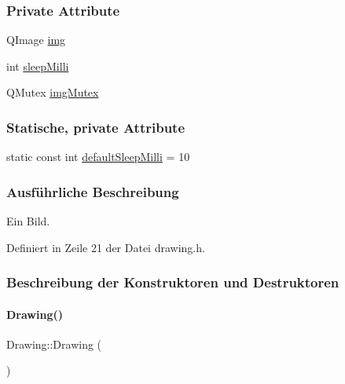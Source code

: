 \subsubsection*{Private Attribute}
\begin{DoxyCompactItemize}
\item 
Q\+Image \mbox{\hyperlink{classDrawing_a8c2defb1fd8bab5ebc0b38da136f8e2b}{img}}
\item 
int \mbox{\hyperlink{classDrawing_a7a904cbe419acdcd9187f1334b0b632c}{sleep\+Milli}}
\item 
Q\+Mutex \mbox{\hyperlink{classDrawing_a1a0a2569cbbab72dffcd088df14428de}{img\+Mutex}}
\end{DoxyCompactItemize}
\subsubsection*{Statische, private Attribute}
\begin{DoxyCompactItemize}
\item 
static const int \mbox{\hyperlink{classDrawing_a208988699d8af4c3f53ebad688bc42bf}{default\+Sleep\+Milli}} = 10
\end{DoxyCompactItemize}


\subsubsection{Ausführliche Beschreibung}
Ein Bild. 

Definiert in Zeile 21 der Datei drawing.\+h.



\subsubsection{Beschreibung der Konstruktoren und Destruktoren}
\mbox{\label{classDrawing_a9fb3a5b171cda26bb4dfccce875642c3}} 
\paragraph{\texorpdfstring{Drawing()}{Drawing()}\hspace{0.1cm}{\footnotesize\ttfamily [1/4]}}
{\footnotesize\ttfamily Drawing\+::\+Drawing (\begin{DoxyParamCaption}{ }\end{DoxyParamCaption})\hspace{0.3cm}{\ttfamily [inline]}}



